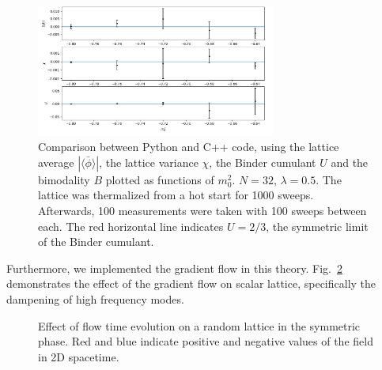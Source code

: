 \documentclass[12pt]{article}
\begin{document}
\begin{figure}[h]
  \centering
      \includegraphics[width=0.7\textwidth]{imgs/compare.png}
      \caption{Comparison between Python and C++ code, using the lattice average $|\langle\bar\phi\rangle|$, the lattice variance $\chi$, the Binder cumulant $U$ and the bimodality $B$ plotted as functions of $m_0^2$. $N=32$, $\lambda=0.5$. The lattice was thermalized from a hot start for 1000 sweeps. Afterwards, 100 measurements were taken with 100 sweeps between each. The red horizontal line indicates $U=2/3$, the symmetric limit of the Binder cumulant.}
  \label{fig:compare}
\end{figure}


Furthermore, we implemented the gradient flow in this theory. Fig.~\ref{fig:flow} demonstrates the effect of the gradient flow on scalar lattice, specifically the dampening of high frequency modes.
\begin{figure}[h]
  \centering
          \caption{Effect of flow time evolution on a random lattice in the symmetric phase. Red and blue indicate positive and negative values of the field in 2D spacetime.}
  \label{fig:flow}
\end{figure}
\end{document}
